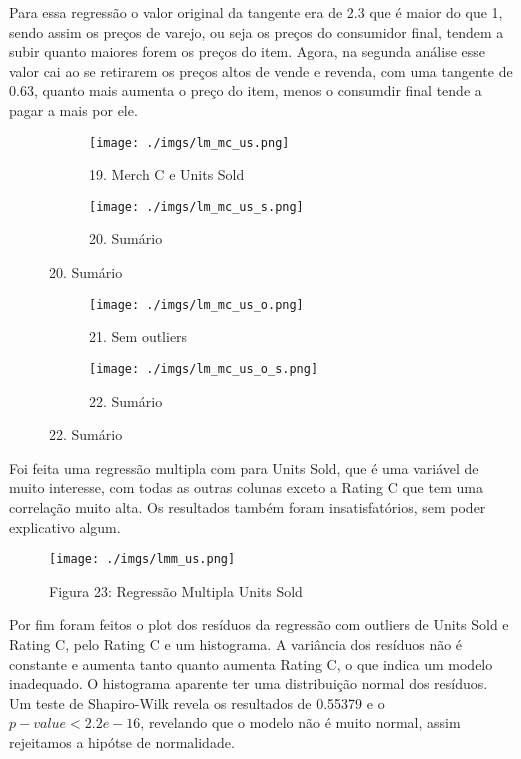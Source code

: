 \documentclass[12pt, a4paper]{article}
\begin{document}
Para essa regressão o valor original da tangente era de 2.3 que é maior do que 1, sendo assim os preços de varejo, ou seja os preços do consumidor final, tendem a subir quanto maiores forem os preços do item. Agora, na segunda análise esse valor cai ao se retirarem os preços altos de vende e revenda, com uma tangente de 0.63, quanto mais aumenta o preço do item, menos o consumdir final tende a pagar a mais por ele.

\FloatBarrier
\begin{figure}[h]
  \begin{subfigure}[b]{0.4\textwidth}
    \texttt{[image: ./imgs/lm\_mc\_us.png]}
    \caption*{19. Merch C e Units Sold}
    \label{fig:1}
  \end{subfigure}
  \begin{subfigure}[b]{0.5\textwidth}
    \texttt{[image: ./imgs/lm\_mc\_us\_s.png]}
    \caption*{20. Sumário}
    \label{fig:2}
  \end{subfigure}
\end{figure}
\FloatBarrier 

\FloatBarrier
\begin{figure}[h]
  \begin{subfigure}[b]{0.4\textwidth}
    \texttt{[image: ./imgs/lm\_mc\_us\_o.png]}
    \caption*{21. Sem outliers}
    \label{fig:1}
  \end{subfigure}
  \begin{subfigure}[b]{0.5\textwidth}
    \texttt{[image: ./imgs/lm\_mc\_us\_o\_s.png]}
    \caption*{22. Sumário}
    \label{fig:2}
  \end{subfigure}
\end{figure}
\FloatBarrier 

Foi feita uma regressão multipla com para Units Sold, que é uma variável de muito interesse, com todas as outras colunas exceto a Rating C que tem uma correlação muito alta. Os resultados também foram insatisfatórios, sem poder explicativo algum.

\FloatBarrier
\begin{figure}[h]
\texttt{[image: ./imgs/lmm\_us.png]}
\caption*{Figura 23: Regressão Multipla Units Sold}
\end{figure}
\FloatBarrier 

Por fim foram feitos o plot dos resíduos da regressão com outliers de Units Sold e Rating C, pelo Rating C e um histograma. A variância dos resíduos não é constante e aumenta tanto quanto aumenta Rating C, o que indica um modelo inadequado. O histograma aparente ter uma distribuição normal dos resíduos. Um teste de Shapiro-Wilk revela os resultados de 0.55379 e o $p-value < 2.2e-16$, revelando que o modelo não é muito normal, assim rejeitamos a hipótse de normalidade.
\end{document}
